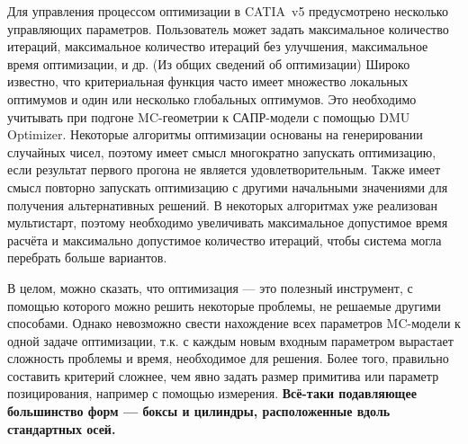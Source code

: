 Для управления процессом оптимизации в CATIA~v5 предусмотрено несколько управляющих параметров. Пользователь может задать максимальное количество итераций, максимальное количество итераций без улучшения, максимальное время оптимизации, и др. \todo
(Из общих сведений об оптимизации)
Широко известно, что критериальная функция часто имеет множество локальных оптимумов и один или несколько глобальных оптимумов. Это необходимо учитывать при подгоне MC-геометрии к САПР-модели с помощью DMU Optimizer. Некоторые алгоритмы оптимизации основаны на генерировании случайных чисел, поэтому имеет смысл многократно запускать оптимизацию, если результат первого прогона не является удовлетворительным. Также имеет смысл повторно запускать оптимизацию с другими начальными значениями для получения альтернативных решений. В некоторых алгоритмах уже реализован мультистарт, поэтому необходимо увеличивать максимальное допустимое время расчёта и максимально допустимое количество итераций, чтобы система могла перебрать больше вариантов.

В целом, можно сказать, что оптимизация --- это полезный инструмент, с помощью которого можно решить некоторые проблемы, не решаемые другими способами. Однако невозможно свести нахождение всех параметров MC-модели к одной задаче оптимизации, т.к. с каждым новым входным параметром вырастает сложность проблемы и время, необходимое для решения. Более того, правильно составить критерий сложнее, чем явно задать размер примитива или параметр позицирования, например с помощью измерения. \textbf{Всё-таки подавляющее большинство форм --- боксы и цилиндры, расположенные вдоль стандартных осей.}
